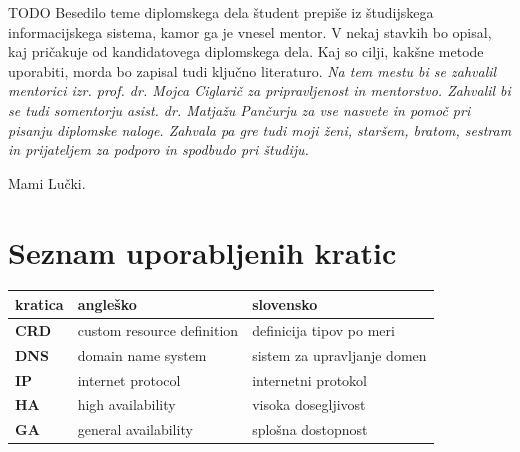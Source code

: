 \documentclass[a4paper, 12pt]{book}
\newcommand{\clearemptydoublepage}{\newpage{\pagestyle{empty}\cleardoublepage}}
\begin{document}
TODO
Besedilo teme diplomskega dela študent prepiše iz študijskega informacijskega sistema, kamor ga je vnesel mentor. V nekaj stavkih bo opisal, kaj pričakuje od kandidatovega diplomskega dela. Kaj so cilji, kakšne metode uporabiti, morda bo zapisal tudi ključno literaturo.
\vspace{15mm}
\vspace{2cm}
\clearemptydoublepage
\thispagestyle{empty}\mbox{}\vfill\null\it%
\noindent
Na tem mestu bi se zahvalil mentorici izr. prof. dr. Mojca Ciglarič za pripravljenost in mentorstvo.
Zahvalil bi se tudi somentorju asist. dr. Matjažu Pančurju za vse nasvete in pomoč pri pisanju diplomske naloge.
Zahvala pa gre tudi moji ženi, staršem, bratom, sestram in prijateljem za podporo in spodbudo pri študiju.
\rm\normalfont
\clearemptydoublepage
\thispagestyle{empty}\mbox{}{\textheight}\mbox{}\hfill\begin{minipage}{0.55\textwidth}%
Mami Lučki.
\normalfont\end{minipage}
\clearemptydoublepage
\pagestyle{empty}
\def\thepage{}%
\tableofcontents{}
\clearemptydoublepage
\chapter*{Seznam uporabljenih kratic}  %
\noindent\begin{tabular}{p{}|p{}|p{}}    %
  {\bf kratica} & {\bf angleško}                             & {\bf slovensko} \\ \hline
  {\bf CRD} & custom resource definition & definicija tipov po meri \\
  {\bf DNS} & domain name system & sistem za upravljanje domen \\
  {\bf IP} & internet protocol & internetni protokol \\
  {\bf HA} & high availability & visoka dosegljivost \\
  {\bf GA} & general availability & splošna dostopnost \\
\end{tabular}
\clearemptydoublepage
\end{document}
